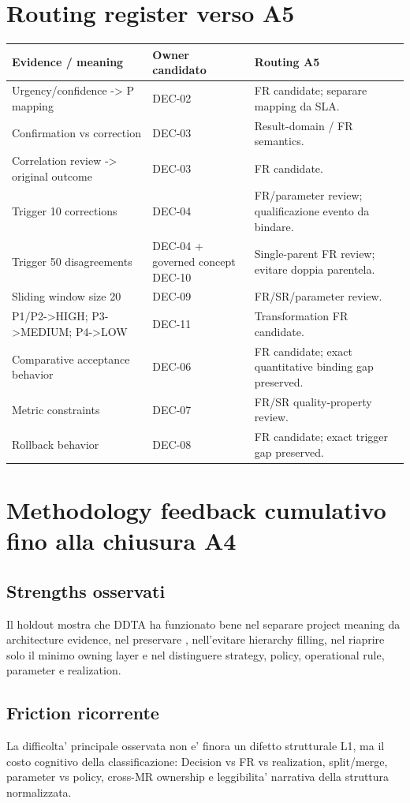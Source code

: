 \documentclass[11pt,a4paper]{article}
\begin{document}
\section{Routing register verso A5}
\begin{longtable}{L{48mm}L{38mm}L{57mm}}
\toprule
\textbf{Evidence / meaning} & \textbf{Owner candidato} & \textbf{Routing A5} \\
\midrule\endhead
Urgency/confidence -> P mapping & DEC-02 & FR candidate; separare mapping da SLA. \\
Confirmation vs correction & DEC-03 & Result-domain / FR semantics. \\
Correlation review -> original outcome & DEC-03 & FR candidate. \\
Trigger 10 corrections & DEC-04 & FR/parameter review; qualificazione evento da bindare. \\
Trigger 50 disagreements & DEC-04 + governed concept DEC-10 & Single-parent FR review; evitare doppia parentela. \\
Sliding window size 20 & DEC-09 & FR/SR/parameter review. \\
P1/P2->HIGH; P3->MEDIUM; P4->LOW & DEC-11 & Transformation FR candidate. \\
Comparative acceptance behavior & DEC-06 & FR candidate; exact quantitative binding gap preserved. \\
Metric constraints & DEC-07 & FR/SR quality-property review. \\
Rollback behavior & DEC-08 & FR candidate; exact trigger gap preserved. \\
\bottomrule
\end{longtable}

\clearpage
\section{Methodology feedback cumulativo fino alla chiusura A4}
\subsection{Strengths osservati}
Il holdout mostra che DDTA ha funzionato bene nel separare project meaning da architecture evidence, nel preservare \NS, nell'evitare hierarchy filling, nel riaprire solo il minimo owning layer e nel distinguere strategy, policy, operational rule, parameter e realization.

\subsection{Friction ricorrente}
La difficolta' principale osservata non e' finora un difetto strutturale L1, ma il costo cognitivo della classificazione: Decision vs FR vs realization, split/merge, parameter vs policy, cross-MR ownership e leggibilita' narrativa della struttura normalizzata.
\end{document}
